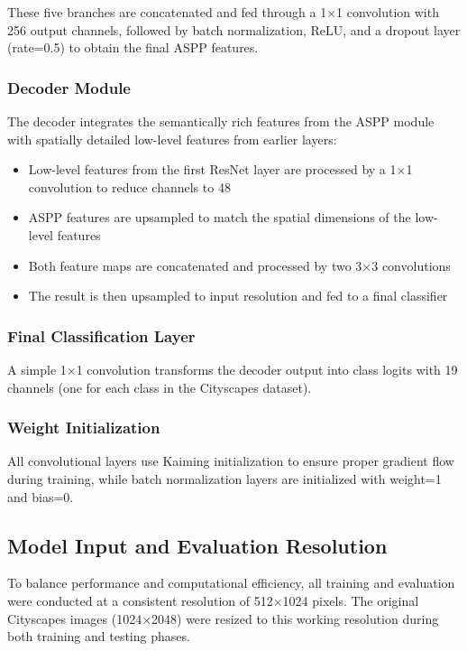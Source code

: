 \documentclass[]{article}
\begin{document}
These five branches are concatenated and fed through a 1×1 convolution with 256 output channels, followed by batch normalization, ReLU, and a dropout layer (rate=0.5) to obtain the final ASPP features.

\subsubsection{Decoder Module}
The decoder integrates the semantically rich features from the ASPP module with spatially detailed low-level features from earlier layers:
\begin{itemize}
    \item Low-level features from the first ResNet layer are processed by a 1×1 convolution to reduce channels to 48
    \item ASPP features are upsampled to match the spatial dimensions of the low-level features
    \item Both feature maps are concatenated and processed by two 3×3 convolutions
    \item The result is then upsampled to input resolution and fed to a final classifier
\end{itemize}

\subsubsection{Final Classification Layer}
A simple 1×1 convolution transforms the decoder output into class logits with 19 channels (one for each class in the Cityscapes dataset).

\subsubsection{Weight Initialization}
All convolutional layers use Kaiming initialization to ensure proper gradient flow during training, while batch normalization layers are initialized with weight=1 and bias=0.



\subsection{Model Input and Evaluation Resolution}
To balance performance and computational efficiency, all training and evaluation were conducted at a consistent resolution of 512×1024 pixels. The original Cityscapes images (1024×2048) were resized to this working resolution during both training and testing phases.
\end{document}
